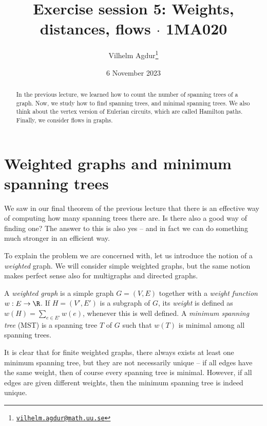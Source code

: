 \documentclass[nobib]{tufte-handout}
\title{Exercise session 5: Weights, distances, flows $\cdot$ 1MA020}
\author[Vilhelm Agdur]{Vilhelm Agdur\thanks{\href{mailto:vilhelm.agdur@math.uu.se}{\nolinkurl{vilhelm.agdur@math.uu.se}}}}
\date{6 November 2023}
\begin{document}
\maketitle%

\begin{abstract}
\noindent
In the previous lecture, we learned how to count the number of spanning trees of a graph. Now, we study how to find spanning trees, and minimal spanning trees. We also think about the vertex version of Eulerian circuits, which are called Hamilton paths. Finally, we consider flows in graphs.
\end{abstract}

\section{Weighted graphs and minimum spanning trees}

We saw in our final theorem of the previous lecture that there is an effective way of computing how many spanning trees there are. Is there also a good way of finding one? The answer to this is also yes -- and in fact we can do something much stronger in an efficient way.

To explain the problem we are concerned with, let us introduce the notion of a \emph{weighted} graph. We will consider simple weighted graphs, but the same notion makes perfect sense also for multigraphs and directed graphs.

\begin{definition}
    A \emph{weighted graph} is a simple graph $G = (V,E)$ together with a \emph{weight function} $w: E \to \R$. If $H = (V', E')$ is a subgraph of $G$, its \emph{weight} is defined as $w(H) = \sum_{e\in E'} w(e)$, whenever this is well defined. A \emph{minimum spanning tree} (MST) is a spanning tree $T$ of $G$ such that $w(T)$ is minimal among all spanning trees.
\end{definition}

It is clear that for finite weighted graphs, there always exists at least one minimum spanning tree, but they are not necessarily unique -- if all edges have the same weight, then of course every spanning tree is minimal. However, if all edges are given different weights, then the minimum spanning tree is indeed unique.
\end{document}
